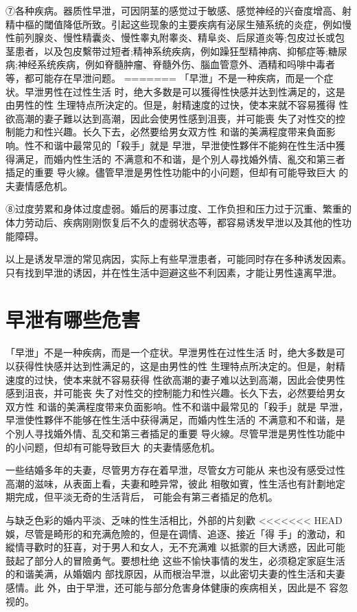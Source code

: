 \documentclass[12pt,UTF8]{ctexbook}
\begin{document}
⑦各种疾病。器质性早泄，可因阴茎的感觉过于敏感、感觉神经的兴奋度增高、射精中樞的閾值降低所致。引起这些现象的主要疾病有泌尿生殖系统的炎症，例如慢性前列腺炎、慢性精囊炎、慢性睾丸附睾炎、精阜炎、后尿道炎等;包皮过长或包茎患者，以及包皮繫带过短者;精神系统疾病，例如躁狂型精神病、抑郁症等;糖尿病;神经系统疾病，例如脊髓肿瘤、脊髓外伤、腦血管意外、酒精和吗啡中毒者等，都可能存在早泄问题。
=======
「早泄」不是一种疾病，而是一个症状。早泄男性在过性生活
时，绝大多数是可以獲得性快感并达到性满足的，这是由男性的性
生理特点所決定的。但是，射精速度的过快，使本来就不容易獲得
性欲高潮的妻子難以达到高潮，因此会使男性感到沮喪，并可能喪
失了对性交的控制能力和性兴趣。长久下去，必然要给男女双方性
和谐的美满程度带来負面影响。性不和谐中最常见的「殺手」就是
早泄，早泄使性夥伴不能夠在性生活中獲得满足，而婚内性生活的
不满意和不和谐，是个別人尋找婚外情、亂交和第三者插足的重要
导火線。儘管早泄是男性性功能中的小问题，但却有可能导致巨大
的夫妻情感危机。

⑧过度劳累和身体过度虚弱。婚后的房事过度、工作负担和压力过于沉重、繁重的体力劳动后、疾病刚刚恢复后不久的虚弱状态等，都容易诱发早泄以及其他的性功能障碍。

以上是诱发早泄的常见病因，实际上有些早泄患者，可能同时存在多种诱发因素。只有找到早泄的诱因，并在性生活中迴避这些不利因素，才能让男性遠离早泄。

\section{早泄有哪些危害}

「早泄」不是一种疾病，而是一个症状。早泄男性在过性生活
时，绝大多数是可以获得性快感并达到性满足的，这是由男性的性
生理特点所决定的。但是，射精速度的过快，使本来就不容易获得
性欲高潮的妻子难以达到高潮，因此会使男性感到沮丧，并可能丧
失了对性交的控制能力和性兴趣。长久下去，必然要给男女双方性
和谐的美满程度带来负面影响。性不和谐中最常见的「殺手」就是
早泄，早泄使性夥伴不能够在性生活中获得满足，而婚内性生活的
不满意和不和谐，是个別人寻找婚外情、乱交和第三者插足的重要
导火線。尽管早泄是男性性功能中的小问题，但却有可能导致巨大
的夫妻情感危机。

一些结婚多年的夫妻，尽管男方存在着早泄，尽管女方可能从
来也没有感受过性高潮的滋味，从表面上看，夫妻和睦异常，彼此
相敬如賓，性生活也有計劃地定期完成，但平淡无奇的生活背后，
可能会有第三者插足的危机。

与缺乏色彩的婚内平淡、乏味的性生活相比，外部的片刻歡
<<<<<<< HEAD
娛，尽管是畸形的和充满危險的，但是在调情、追逐、接近「得
手」的激动，和縱情寻歡时的狂喜，对于男人和女人，无不充满难
以抵禦的巨大诱惑，因此可能鼓起了部分人的冒險勇气。要想杜绝
这些不愉快事情的发生，必须稳定家庭生活的和谐美满，从婚姻内
部找原因，从而根治早泄，以此密切夫妻的性生活和夫妻感情。此
外，由于早泄，还可能与部分危害身体健康的疾病相关，因此是不
容忽视的。
\end{document}
